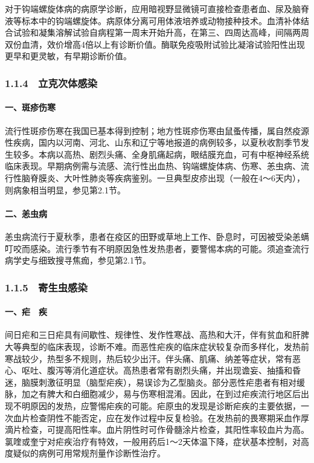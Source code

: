 对于钩端螺旋体病的病原学诊断，应用暗视野显微镜可直接检查患者血、尿及脑脊液等标本中的钩端螺旋体。病原体分离可用体液培养或动物接种技术。血清补体结合试验和凝集溶解试验自病程第一周末开始升高，在第三、四周达高峰，间隔两周双份血清，效价增高4倍以上有诊断价值。酶联免疫吸附试验比凝溶试验阳性出现更早和更灵敏，有早期诊断价值。

\protect\hypertarget{text00016.html}{}{}

\subsubsection{1.1.4　立克次体感染}

\paragraph{一、斑疹伤寒}

流行性斑疹伤寒在我国已基本得到控制；地方性斑疹伤寒由鼠蚤传播，属自然疫源性疾病，国内以河南、河北、山东和辽宁等地报道的病例较多，以夏秋收割季节发生较多。本病以高热、剧烈头痛、全身肌痛起病，眼结膜充血，可有中枢神经系统临床表现。早期病例需与流感、流行性出血热、钩端螺旋体病、伤寒、恙虫病、流行性脑脊膜炎、大叶性肺炎等疾病鉴别。一旦典型皮疹出现（一般在4～6天内），则病象相当明显，参见第2.1节。

\paragraph{二、恙虫病}

恙虫病流行于夏秋季，患者在疫区的田野或草地上工作、卧息时，可因被受染恙螨叮咬而感染。流行季节有不明原因急性发热患者，要警惕本病的可能。须追查流行病学史与细致搜寻焦痂，参见第2.1节。

\protect\hypertarget{text00017.html}{}{}

\subsubsection{1.1.5　寄生虫感染}

\paragraph{一、疟　疾}

间日疟和三日疟具有间歇性、规律性、发作性寒战、高热和大汗，伴有贫血和肝脾大等典型的临床表现，诊断不难。而恶性疟疾的临床症状较复杂而多样化，发热前寒战较少，热型多不规则，热后较少出汗。伴头痛、肌痛、纳差等症状，常有恶心、呕吐、腹泻等消化道症状。高热患者常有剧烈头痛，并出现谵妄、抽搐和昏迷，脑膜刺激征明显（脑型疟疾），易误诊为乙型脑炎。部分恶性疟患者有相对缓脉，加之有脾大和白细胞减少，易与伤寒相混淆。因此，在到过疟疾流行地区后出现不明原因的发热，应警惕疟疾的可能。疟原虫的发现是诊断疟疾的主要依据，一次血片检查阴性不能否定，应在发作过程中反复检验。在发热前的畏寒期采血作厚滴片检查，可提高阳性率。血片阴性时可作骨髓涂片检查，其阳性率较血片为高。氯喹或奎宁对疟疾治疗有特效，一般用药后1～2天体温下降，症状基本控制，对高度疑似的病例可用常规剂量作诊断性治疗。

